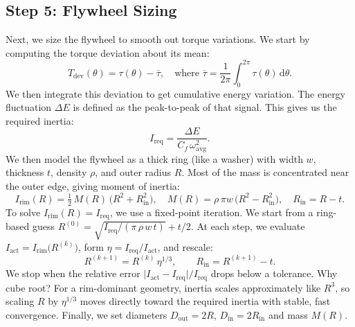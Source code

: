 \documentclass[12pt]{article}
\begin{document}
\subsection{Step 5: Flywheel Sizing}
Next, we size the flywheel to smooth out torque variations. We start by computing the torque deviation about its mean:
\begin{equation}
  T_{\text{dev}}(\theta) = \tau(\theta) - \overline{\tau}, \quad \text{where } \overline{\tau} = \frac{1}{2\pi}\int_0^{2\pi} \tau(\theta)\,\mathrm{d}\theta.
\end{equation}
We then integrate this deviation to get cumulative energy variation. The energy fluctuation \(\Delta E\) is defined as the peak-to-peak of that signal. This gives us the required inertia:
\begin{equation}
  I_{\mathrm{req}} = \frac{\Delta E}{C_{f}\,\omega_{\!\text{avg}}^{2}}.
\end{equation}
We then model the flywheel as a thick ring (like a washer) with width \(w\), thickness \(t\), density \(\rho\), and outer radius \(R\). Most of the mass is concentrated near the outer edge, giving moment of inertia:
\begin{equation}
  I_{\mathrm{rim}}(R) = \tfrac{1}{2}\,M(R)\,\bigl(R^{2}+R_{\mathrm{in}}^{2}\bigr),\quad M(R)=\rho\,\pi w\,\bigl(R^{2}-R_{\mathrm{in}}^{2}\bigr),\quad R_{\mathrm{in}}=R-t.
\end{equation}
To solve \(I_{\mathrm{rim}}(R)=I_{\mathrm{req}}\), we use a fixed-point iteration. We start from a ring-based guess
\(R^{(0)} = \sqrt{I_{\mathrm{req}}/(\pi\,\rho\,w\,t)} + t/2\). At each step, we evaluate
\(I_{\mathrm{act}} = I_{\mathrm{rim}}\bigl(R^{(k)}\bigr)\), form \(\eta = I_{\mathrm{req}}/I_{\mathrm{act}}\), and rescale:
\begin{equation}
  R^{(k+1)} = R^{(k)}\,\eta^{1/3},\qquad R_{\mathrm{in}}=R^{(k+1)}-t.
\end{equation}
We stop when the relative error \(\lvert I_{\mathrm{act}}-I_{\mathrm{req}}\rvert/I_{\mathrm{req}}\) drops below a tolerance.
Why cube root? For a rim-dominant geometry, inertia scales approximately like \(R^{3}\), so scaling \(R\) by \(\eta^{1/3}\) moves directly toward the required inertia with stable, fast convergence.
Finally, we set diameters \(D_{\mathrm{out}}=2R\), \(D_{\mathrm{in}}=2R_{\mathrm{in}}\) and mass \(M(R)\).
\end{document}

